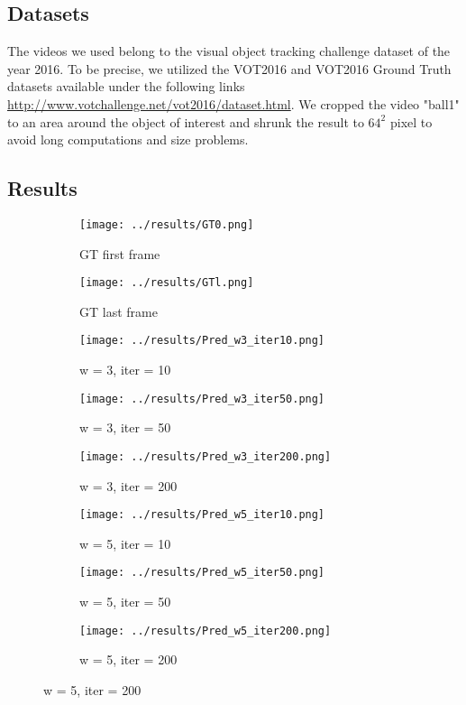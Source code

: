 \documentclass{article}
\begin{document}
{\subsection{Datasets}
The videos we used belong to the visual object tracking challenge dataset of the year 2016. To be precise, we utilized the VOT2016 and VOT2016 Ground Truth datasets available under the following links \hyperlink{http://www.votchallenge.net/vot2016/dataset.html}{http://www.votchallenge.net/vot2016/dataset.html}. We cropped the video "ball1" to an area around the object of interest and shrunk the result to $64^2$ pixel to avoid long computations and size problems.
\subsection{Results}\label{results_section}

\begin{figure}
\label{results}
    \centering
    
	\begin{subfigure}[b]{0.15\textwidth}
		\centering    
        \texttt{[image: ../results/GT0.png]}
        \caption{GT first frame}
    \end{subfigure}
    \begin{subfigure}[b]{0.15\textwidth}
        \centering
        \texttt{[image: ../results/GTl.png]}
        \caption{GT last frame}
    \end{subfigure}%
    
    \begin{subfigure}[t]{0.15\textwidth}
        \centering
        \texttt{[image: ../results/Pred\_w3\_iter10.png]}
        \caption{w = 3, iter = 10}
    \end{subfigure}
    \begin{subfigure}[t]{0.15\textwidth}
        \centering
        \texttt{[image: ../results/Pred\_w3\_iter50.png]}
        \caption{w = 3, iter = 50}
    \end{subfigure}
    \begin{subfigure}[t]{0.15\textwidth}
        \centering
        \texttt{[image: ../results/Pred\_w3\_iter200.png]}
        \caption{w = 3, iter = 200}
    \end{subfigure}
   
    \begin{subfigure}[t]{0.15\textwidth}
        \centering
        \texttt{[image: ../results/Pred\_w5\_iter10.png]}
        \caption{w = 5, iter = 10}
    \end{subfigure}
    \begin{subfigure}[t]{0.15\textwidth}
        \centering
        \texttt{[image: ../results/Pred\_w5\_iter50.png]}
        \caption{w = 5, iter = 50}
    \end{subfigure}
    \begin{subfigure}[t]{0.15\textwidth}
        \centering
        \texttt{[image: ../results/Pred\_w5\_iter200.png]}
        \caption{w = 5, iter = 200}
    \end{subfigure}


\end{figure}}
\end{document}
